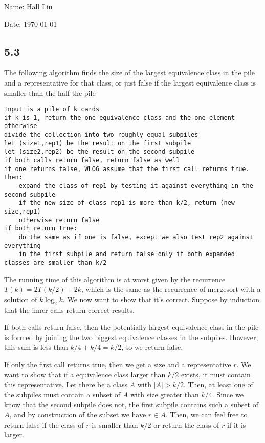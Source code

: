 \documentclass{article}
\begin{document}
Name: Hall Liu

Date: \today 
\vspace{1.5cm}
\subsection*{5.3}
The following algorithm finds the size of the largest equivalence class in the pile and a representative for that class, or just false if the largest equivalence class is smaller than the half the pile
\begin{verbatim}
Input is a pile of k cards
if k is 1, return the one equivalence class and the one element
otherwise
divide the collection into two roughly equal subpiles
let (size1,rep1) be the result on the first subpile
let (size2,rep2) be the result on the second subpile
if both calls return false, return false as well
if one returns false, WLOG assume that the first call returns true. then:
    expand the class of rep1 by testing it against everything in the second subpile
    if the new size of class rep1 is more than k/2, return (new size,rep1)
    otherwise return false
if both return true:
    do the same as if one is false, except we also test rep2 against everything 
    in the first subpile and return false only if both expanded classes are smaller than k/2
\end{verbatim}

The running time of this algorithm is at worst given by the recurrence $T(k)=2T(k/2)+2k$, which is the same as the recurrence of mergesort with a solution of $k\log_2k$. We now want to show that it's correct. Suppose by induction that the inner calls return correct results. 

If both calls return false, then the potentially largest equivalence class in the pile is formed by joining the two biggest equivalence classes in the subpiles. However, this sum is less than $k/4+k/4=k/2$, so we return false.

If only the first call returns true, then we get a size and a representative $r$. We want to show that if a equivalence class larger than $k/2$ exists, it must contain this representative. Let there be a class $A$ with $|A|>k/2$. Then, at least one of the subpiles must contain a subset of $A$ with size greater than $k/4$. Since we know that the second subpile does not, the first subpile contains such a subset of $A$, and by construction of the subset we have $r\in A$. Then, we can feel free to return false if the class of $r$ is smaller than $k/2$ or return the class of $r$ if it is larger.
\end{document}
